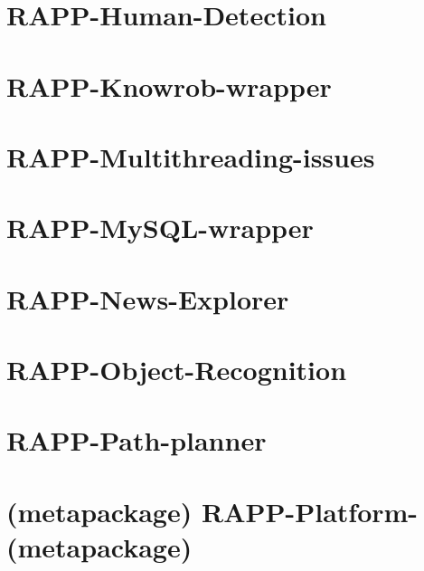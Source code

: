 \documentclass[twoside]{book}
\begin{document}
\chapter{R\-A\-P\-P-\/\-Human-\/\-Detection}
\label{md_rapp-platform_8wiki_RAPP-Human-Detection}
\hypertarget{md_rapp-platform_8wiki_RAPP-Human-Detection}{}

\chapter{R\-A\-P\-P-\/\-Knowrob-\/wrapper}
\label{md_rapp-platform_8wiki_RAPP-Knowrob-wrapper}
\hypertarget{md_rapp-platform_8wiki_RAPP-Knowrob-wrapper}{}

\chapter{R\-A\-P\-P-\/\-Multithreading-\/issues}
\label{md_rapp-platform_8wiki_RAPP-Multithreading-issues}
\hypertarget{md_rapp-platform_8wiki_RAPP-Multithreading-issues}{}

\chapter{R\-A\-P\-P-\/\-My\-S\-Q\-L-\/wrapper}
\label{md_rapp-platform_8wiki_RAPP-MySQL-wrapper}
\hypertarget{md_rapp-platform_8wiki_RAPP-MySQL-wrapper}{}

\chapter{R\-A\-P\-P-\/\-News-\/\-Explorer}
\label{md_rapp-platform_8wiki_RAPP-News-Explorer}
\hypertarget{md_rapp-platform_8wiki_RAPP-News-Explorer}{}

\chapter{R\-A\-P\-P-\/\-Object-\/\-Recognition}
\label{md_rapp-platform_8wiki_RAPP-Object-Recognition}
\hypertarget{md_rapp-platform_8wiki_RAPP-Object-Recognition}{}

\chapter{R\-A\-P\-P-\/\-Path-\/planner}
\label{md_rapp-platform_8wiki_RAPP-Path-planner}
\hypertarget{md_rapp-platform_8wiki_RAPP-Path-planner}{}

\chapter{(metapackage) R\-A\-P\-P-\/\-Platform-\/(metapackage)}
\label{md_rapp-platform_8wiki_RAPP-Platform-}
\hypertarget{md_rapp-platform_8wiki_RAPP-Platform-}{}

\end{document}
